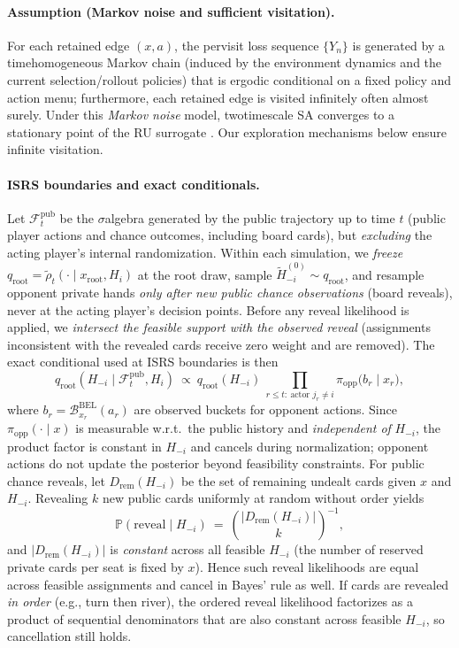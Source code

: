 \documentclass[10pt]{article}
\newcommand{\1}{\mathbf{1}}
\theoremstyle{plain}
\begin{document}
\paragraph{Assumption (Markov noise and sufficient visitation).}
For each retained edge $(x,a)$, the per\textendash visit loss sequence $\{Y_n\}$ is generated by a time\textendash homogeneous Markov chain (induced by the environment dynamics and the current selection/rollout policies) that is ergodic conditional on a fixed policy and action menu; furthermore, each retained edge is visited infinitely often almost surely. Under this \emph{Markov noise} model, two\textendash timescale SA converges to a stationary point of the RU surrogate \citep[Ch.~6]{borkar2008sa}. Our exploration mechanisms below ensure infinite visitation.

\paragraph{IS\textendash RS boundaries and exact conditionals.}
Let $\mathcal{F}^{\mathrm{pub}}_t$ be the $\sigma$\textendash algebra generated by the public trajectory up to time $t$ (public player actions and chance outcomes, including board cards), but \emph{excluding} the acting player's internal randomization. Within each simulation, we \emph{freeze} $q_{\mathrm{root}}=\tilde\rho_t(\cdot\mid x_{\mathrm{root}},H_i)$ at the root draw, sample $\tilde H_{-i}^{(0)}\sim q_{\mathrm{root}}$, and resample opponent private hands \emph{only after new public \emph{chance} observations} (board reveals), never at the acting player's decision points. Before any reveal likelihood is applied, we \emph{intersect the feasible support with the observed reveal} (assignments inconsistent with the revealed cards receive zero weight and are removed). The exact conditional used at IS\textendash RS boundaries is then
\begin{equation}
\label{eq:exact_conditional}
q_{\mathrm{root}}(H_{-i}\mid \mathcal{F}^{\mathrm{pub}}_t, H_i)\ \propto\ q_{\mathrm{root}}(H_{-i})\ \prod_{r\le t:\ \text{actor }j_r\neq i} \pi_{\mathrm{opp}}\!\big(b_r\mid x_r\big),
\end{equation}
where $b_r=\mathcal{B}^{\mathrm{BEL}}_{x_r}(a_r)$ are observed buckets for opponent actions. Since $\pi_{\mathrm{opp}}(\cdot\mid x)$ is measurable w.r.t.\ the public history and \emph{independent of} $H_{-i}$, the product factor is constant in $H_{-i}$ and cancels during normalization; opponent actions do not update the posterior beyond feasibility constraints. For public chance reveals, let $D_{\mathrm{rem}}(H_{-i})$ be the set of remaining undealt cards given $x$ and $H_{-i}$. Revealing $k$ new public cards uniformly at random without order yields
\[
\mathbb{P}(\text{reveal}\mid H_{-i})\ =\ \binom{|D_{\mathrm{rem}}(H_{-i})|}{k}^{-1},
\]
and $|D_{\mathrm{rem}}(H_{-i})|$ is \emph{constant} across all feasible $H_{-i}$ (the number of reserved private cards per seat is fixed by $x$). Hence such reveal likelihoods are equal across feasible assignments and cancel in Bayes’ rule as well. If cards are revealed \emph{in order} (e.g., turn then river), the ordered reveal likelihood factorizes as a product of sequential denominators that are also constant across feasible $H_{-i}$, so cancellation still holds.
\end{document}
